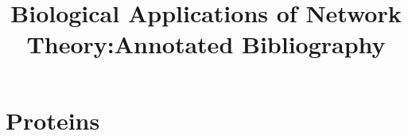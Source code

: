 

\bibliographyunit[\section]

\title{Biological Applications of Network Theory:Annotated Bibliography} 

\author{
}

\maketitle
\section{Proteins}
\nocite{PhysRevE.65.061910}
\nocite{000186918300012}
\nocite{Sol:2006uq}
\nocite{17531094}
\nocite{1562092}
\putbib

